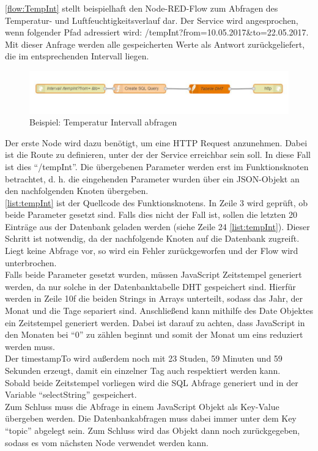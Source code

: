 \autoref{flow:TempInt} stellt beispielhaft den Node-RED-Flow zum Abfragen des Temperatur- und Luftfeuchtigkeitsverlauf dar. Der Service wird angesprochen, wenn folgender Pfad adressiert wird: /tempInt?from=10.05.2017\&to=22.05.2017. Mit dieser Anfrage werden alle gespeicherten Werte als Antwort zurückgeliefert, die im entsprechenden Intervall liegen.
\begin{figure}[h]
	\centering
	\includegraphics[scale=0.7]{images/tempIntFlow}
	\caption{Beispiel: Temperatur Intervall abfragen}
	\label{flow:TempInt}
\end{figure}
Der erste Node wird dazu benötigt, um eine HTTP Request anzunehmen. Dabei ist die Route zu definieren, unter der der Service erreichbar sein soll. In diese Fall ist dies \enquote{/tempInt}. Die übergebenen Parameter werden erst im Funktionsknoten betrachtet, d. h. die eingehenden Parameter wurden über ein JSON-Objekt an den nachfolgenden Knoten übergeben. 
\\\autoref{list:tempInt} ist der Quellcode des Funktionsknotens. In Zeile 3 wird geprüft, ob beide Parameter gesetzt sind. Falls dies nicht der Fall ist, sollen die letzten 20 Einträge aus der Datenbank geladen werden (siehe Zeile 24 \autoref{list:tempInt}). Dieser Schritt ist notwendig, da der nachfolgende Knoten auf die Datenbank zugreift. Liegt keine Abfrage vor, so wird ein Fehler zurückgeworfen und der Flow wird unterbrochen. 
\\Falls beide Parameter gesetzt wurden, müssen JavaScript Zeitstempel generiert werden, da nur solche in der Datenbanktabelle DHT gespeichert sind. Hierfür werden in Zeile 10f die beiden Strings in Arrays unterteilt, sodass das Jahr, der Monat und die Tage separiert sind. Anschließend kann mithilfe des Date Objektes ein Zeitstempel generiert werden. Dabei ist darauf zu achten, dass JavaScript in den Monaten bei \enquote{0} zu zählen beginnt und somit der Monat um eins reduziert werden muss. \\Der timestampTo wird außerdem noch mit 23 Studen, 59 Minuten und 59 Sekunden erzeugt, damit ein einzelner Tag auch respektiert werden kann. \\Sobald beide Zeitstempel vorliegen wird die \ac{SQL} Abfrage generiert und in der Variable \enquote{selectString} gespeichert. \\Zum Schluss muss die Abfrage in einem JavaScript Objekt als Key-Value übergeben werden. Die Datenbankabfragen muss dabei immer unter dem Key \enquote{topic} abgelegt sein. Zum Schluss wird das Objekt dann noch zurückgegeben, sodass es vom nächsten Node verwendet werden kann. 
